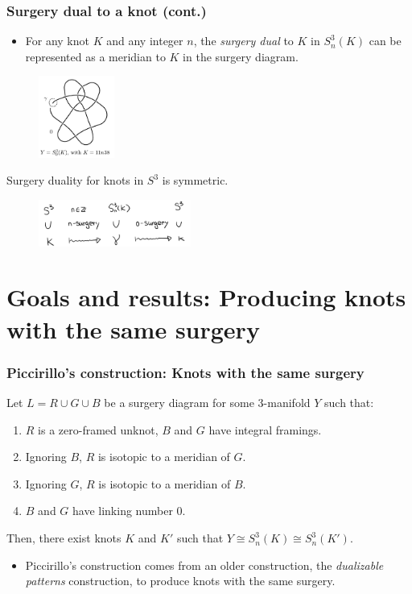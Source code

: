 \documentclass{beamer}
\theoremstyle{ex}
\theoremstyle{rem}
\begin{document}
\begin{frame}
	\frametitle{Surgery dual to a knot (cont.)}
	\begin{itemize} 
		\item For any knot $K$ and any integer $n$, the \textit{surgery dual} to $K$ in $S^3_n(K)$ can be represented as a meridian to $K$ in the surgery diagram. 
	\end{itemize}
	\begin{figure}
		\centering
		\includegraphics[width=25mm]{dual.png}
	\end{figure}
	\begin{lemma}
		Surgery duality for knots in $S^3$ is symmetric. 
	\end{lemma}
	\begin{figure}
		\centering
		\includegraphics[width=50mm]{Symmetry.jpg}
	\end{figure}
\end{frame}


	
\section{Goals and results: Producing knots with the same surgery}
	\begin{frame}
	\frametitle{Piccirillo's construction: Knots with the same surgery}
	\begin{theorem}[Piccirillo 2018]
		Let $L = R \cup G \cup B$ be a surgery diagram for some 3-manifold $Y$ such that:
		\begin{enumerate}
			\item $R$ is a zero-framed unknot, $B$ and $G$ have integral framings.
			\item Ignoring $B$, $R$ is isotopic to a meridian of $G$.
			\item Ignoring $G$, $R$ is isotopic to a meridian of $B$.
			\item $B$ and $G$ have linking number $0$.
		\end{enumerate}
		Then, there exist knots $K$ and $K'$ such that $Y \cong S^3_{n}(K) \cong S^3_{n}(K')$.
	\end{theorem}
	\begin{itemize}
		\item Piccirillo's construction comes from an older construction, the \textit{dualizable patterns} construction, to produce knots with the same surgery.
	\end{itemize}
\end{frame}
\end{document}
